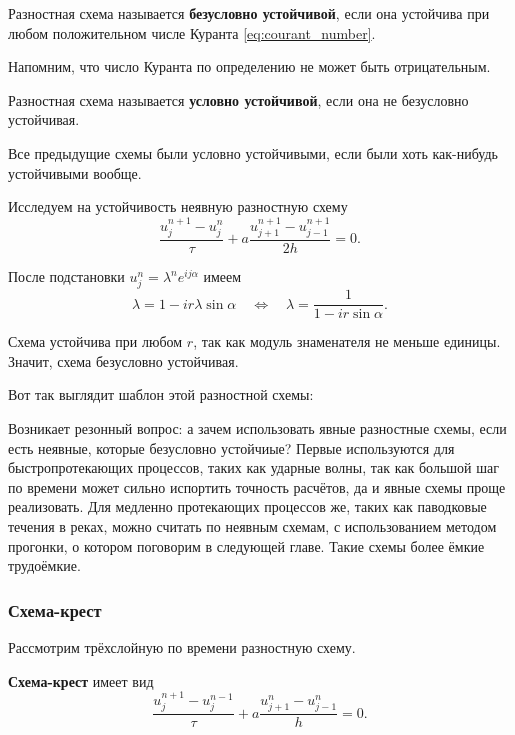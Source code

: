 \documentclass{article}
\begin{document}
\begin{define}
	Разностная схема называется \textbf{безусловно устойчивой}, если она
	устойчива при любом положительном числе Куранта
	\eqref{eq:courant_number}.
\end{define}

Напомним, что число Куранта по определению не может быть отрицательным.

\begin{define}
	Разностная схема называется \textbf{условно устойчивой}, если она не
	безусловно устойчивая.
\end{define}

Все предыдущие схемы были условно устойчивыми, если были хоть как-нибудь
устойчивыми вообще.

\begin{example}
	Исследуем на устойчивость неявную разностную схему
	\[\frac{u_j^{n+1}-u_j^n}{\tau}+a\frac{u_{j+1}^{n+1}-u_{j-1}^{n+1}}{2h}=
	0.\]

	После подстановки $u_j^n=\lambda^ne^{ij\alpha}$ имеем
	\[\lambda=1-ir\lambda\sin\alpha\quad\Leftrightarrow\quad
	\lambda=\frac{1}{1-ir\sin\alpha}.\]

	Схема устойчива при любом $r$, так как модуль знаменателя не меньше
	единицы. Значит, схема безусловно устойчивая.

	Вот так выглядит шаблон этой разностной схемы: \\

	
\end{example}

Возникает резонный вопрос: а зачем использовать явные разностные схемы, если
есть неявные, которые безусловно устойчиые? Первые используются для
быстропротекающих процессов, таких как ударные волны, так как большой шаг по
времени может сильно испортить точность расчётов, да и явные схемы проще
реализовать. Для медленно протекающих процессов же, таких как паводковые течения
в реках, можно считать по неявным схемам, с использованием методом прогонки,
о котором поговорим в следующей главе. Такие схемы более ёмкие трудоёмкие.

\subsubsection{Схема-крест}
Рассмотрим трёхслойную по времени разностную схему.

\begin{define}
	\textbf{Схема-крест} имеет вид
	\[\frac{u_j^{n+1}-u_j^{n-1}}{\tau}+a\frac{u_{j+1}^n-u_{j-1}^n}{h}=
	0.\]
\end{define}
\end{document}
